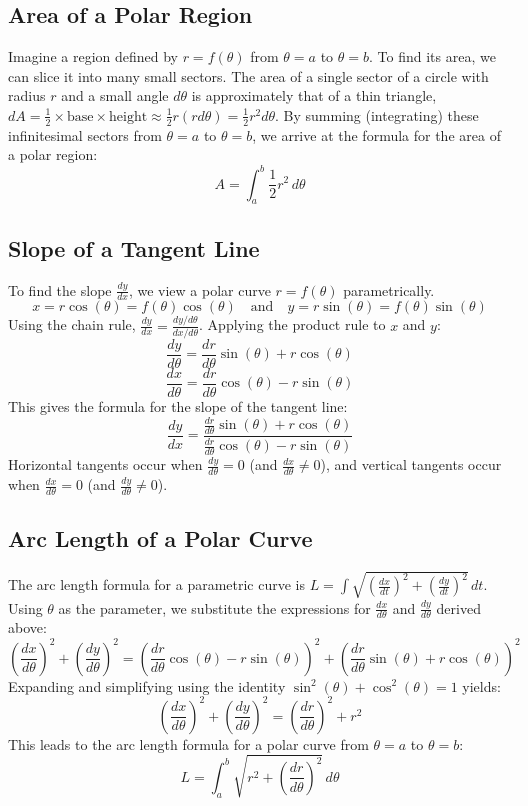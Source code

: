 \documentclass{article}
\begin{document}
\subsection{Area of a Polar Region}
Imagine a region defined by $r = f(\theta)$ from $\theta = a$ to $\theta = b$. To find its area, we can slice it into many small sectors. The area of a single sector of a circle with radius $r$ and a small angle $d\theta$ is approximately that of a thin triangle, $dA = \frac{1}{2} \times \text{base} \times \text{height} \approx \frac{1}{2} r (r d\theta) = \frac{1}{2}r^2 d\theta$.
By summing (integrating) these infinitesimal sectors from $\theta = a$ to $\theta = b$, we arrive at the formula for the area of a polar region:
\[ A = \int_{a}^{b} \frac{1}{2} r^2 \,d\theta \]

\subsection{Slope of a Tangent Line}
To find the slope $\frac{dy}{dx}$, we view a polar curve $r = f(\theta)$ parametrically.
\[ x = r \cos(\theta) = f(\theta) \cos(\theta) \quad \text{and} \quad y = r \sin(\theta) = f(\theta) \sin(\theta) \]
Using the chain rule, $\frac{dy}{dx} = \frac{dy/d\theta}{dx/d\theta}$. Applying the product rule to $x$ and $y$:
\[ \frac{dy}{d\theta} = \frac{dr}{d\theta}\sin(\theta) + r\cos(\theta) \]
\[ \frac{dx}{d\theta} = \frac{dr}{d\theta}\cos(\theta) - r\sin(\theta) \]
This gives the formula for the slope of the tangent line:
\[ \frac{dy}{dx} = \frac{\frac{dr}{d\theta}\sin(\theta) + r\cos(\theta)}{\frac{dr}{d\theta}\cos(\theta) - r\sin(\theta)} \]
Horizontal tangents occur when $\frac{dy}{d\theta} = 0$ (and $\frac{dx}{d\theta} \neq 0$), and vertical tangents occur when $\frac{dx}{d\theta} = 0$ (and $\frac{dy}{d\theta} \neq 0$).

\subsection{Arc Length of a Polar Curve}
The arc length formula for a parametric curve is $L = \int \sqrt{(\frac{dx}{dt})^2 + (\frac{dy}{dt})^2} \,dt$. Using $\theta$ as the parameter, we substitute the expressions for $\frac{dx}{d\theta}$ and $\frac{dy}{d\theta}$ derived above:
\[ \left(\frac{dx}{d\theta}\right)^2 + \left(\frac{dy}{d\theta}\right)^2 = \left(\frac{dr}{d\theta}\cos(\theta) - r\sin(\theta)\right)^2 + \left(\frac{dr}{d\theta}\sin(\theta) + r\cos(\theta)\right)^2 \]
Expanding and simplifying using the identity $\sin^2(\theta) + \cos^2(\theta) = 1$ yields:
\[ \left(\frac{dx}{d\theta}\right)^2 + \left(\frac{dy}{d\theta}\right)^2 = \left(\frac{dr}{d\theta}\right)^2 + r^2 \]
This leads to the arc length formula for a polar curve from $\theta = a$ to $\theta = b$:
\[ L = \int_{a}^{b} \sqrt{r^2 + \left(\frac{dr}{d\theta}\right)^2} \,d\theta \]
\end{document}
